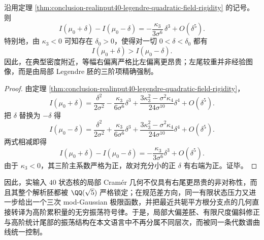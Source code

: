 \begin{corollary}\label{cor:conclusion-realinput40-local-cramer-right-tail-more-costly}
沿用定理 \ref{thm:conclusion-realinput40-legendre-quadratic-field-rigidity} 的记号。则
\[
I(\mu_0+\delta)-I(\mu_0-\delta)
=
-\frac{\kappa_3}{3\sigma^6}\,\delta^3+O(\delta^5).
\]
特别地，由 \(\kappa_3<0\) 可知存在 \(\delta_0>0\)，使得对一切 \(0<\delta<\delta_0\) 都有
\[
I(\mu_0+\delta)>I(\mu_0-\delta).
\]
因此，在典型密度附近，等幅右偏离严格比左偏离更昂贵；左尾较重并非经验图像，而是由局部 Legendre 胚的三阶项精确强制。
\end{corollary}
\begin{proof}
由定理 \ref{thm:conclusion-realinput40-legendre-quadratic-field-rigidity}，
\[
I(\mu_0+\delta)
=
\frac{\delta^2}{2\sigma^2}
-\frac{\kappa_3}{6\sigma^6}\delta^3
+\frac{3\kappa_3^2-\sigma^2\kappa_4}{24\sigma^{10}}\delta^4
+O(\delta^5).
\]
把 \(\delta\) 替换为 \(-\delta\) 得
\[
I(\mu_0-\delta)
=
\frac{\delta^2}{2\sigma^2}
+\frac{\kappa_3}{6\sigma^6}\delta^3
+\frac{3\kappa_3^2-\sigma^2\kappa_4}{24\sigma^{10}}\delta^4
+O(\delta^5).
\]
两式相减即得
\[
I(\mu_0+\delta)-I(\mu_0-\delta)
=
-\frac{\kappa_3}{3\sigma^6}\delta^3+O(\delta^5).
\]
由于 \(\kappa_3<0\)，其三阶主系数严格为正，故对充分小的正 \(\delta\) 有右端为正。证毕。
\end{proof}

\noindent
因此，实输入 \(40\) 状态核的局部 Cram\'er 几何不仅具有右尾更昂贵的非对称性，而且其整个解析胚都被 \(\QQ(\sqrt5)\) 严格锁定；在规范差方向，同一有限状态压力又进一步给出一个三次 mod-Gaussian 极限函数，并把最近共轭平方根分支点的几何直接转译为高阶累积量的无穷振荡符号律。于是，局部大偏差胚、有限尺度偏斜修正与高阶统计尾部的振荡结构在本文语言中不再分属不同层次，而被同一条代数谱曲线统一控制。

\endinput

